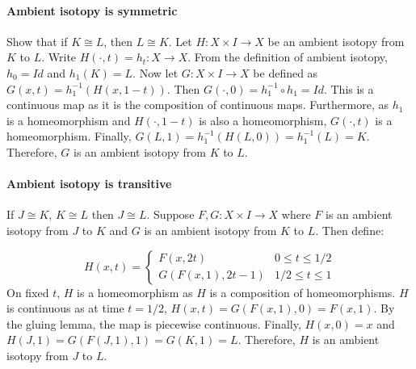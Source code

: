 \documentclass{article}
\theoremstyle{definition}
\numberwithin{theorem}{section}
\numberwithin{equation}{section}
\begin{document}
\paragraph{Ambient isotopy is symmetric}
Show that if $K \cong L$, then $L \cong K$. Let $H : X \times I \rightarrow X$ be an ambient isotopy from $K$ to $L$. Write $H( \cdot, t) = h_t : X \rightarrow X$. From the definition of ambient isotopy, $h_0 = Id$ and $h_1(K) = L$. Now let $G : X \times I \rightarrow X$ be defined as $G(x, t) = h_1^{-1}(H(x, 1-t))$. Then $G(\cdot, 0) = h_1^{-1}\circ h_1 = Id$. This is a continuous map as it is the composition of continuous maps. Furthermore, as $h_1$ is a homeomorphism and $H(\cdot, 1-t)$ is also a homeomorphism, $G(\cdot, t)$ is a homeomorphism. Finally, $G(L, 1) = h_1^{-1}(H(L, 0)) = h_1^{-1}(L) = K$. Therefore, $G$ is an ambient isotopy from $K$ to $L$. 

\paragraph{Ambient isotopy is transitive}

If $J \cong K$, $K \cong L$ then $J \cong L$. Suppose $F, G : X \times I \rightarrow X$ where $F$ is an ambient isotopy from $J$ to $K$ and $G$ is an ambient isotopy from $K$ to $L$. Then define:

\begin{equation*}
    H(x, t) =
    \begin{cases}
        F(x, 2t) & 0 \leq t \leq 1/2\\
        G(F(x, 1), 2t-1) & 1/2 \leq t \leq 1
    \end{cases}
\end{equation*}
On fixed $t$, $H$ is a homeomorphism as $H$ is a composition of homeomorphisms. $H$ is continuous as at time $t = 1/2$, $H(x, t) = G(F(x, 1) , 0) = F(x, 1)$. By the gluing lemma, the map is piecewise continuous. Finally, $H(x, 0) = x$ and $H(J, 1) = G(F(J, 1), 1) = G(K, 1) = L$. Therefore, $H$ is an ambient isotopy from $J$ to $L$. 
\end{document}
